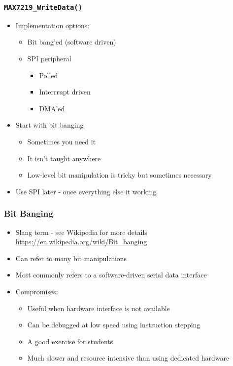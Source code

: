 \documentclass[14pt]{beamer}
\begin{document}
\begin{frame}[fragile]
\frametitle{\texttt{MAX7219\_WriteData()}}
\begin{itemize}
\item Implementation options:
	\begin{itemize}
		\item Bit bang'ed (software driven)
		\item SPI peripheral
			\begin{itemize}
				\item Polled
				\item Interrrupt driven
				\item DMA'ed
			\end{itemize}
	\end{itemize}
\pause
\item Start with bit banging
	\begin{itemize}
		\item Sometimes you need it
		\item It isn't taught anywhere
		\item Low-level bit manipulation is tricky but sometimes necessary
	\end{itemize}
\item Use SPI later - once everything else it working
\end{itemize}
\end{frame}

\begin{frame}[fragile]
\frametitle{Bit Banging}
\begin{itemize}
\item Slang term - see Wikipedia for more details\\
\small
\url{https://en.wikipedia.org/wiki/Bit_banging}
\normalsize
\item Can refer to many bit manipulations
\item Most commonly refers to a software-driven serial data interface
\item Compromises:
	\begin{itemize}
		\item Useful when hardware interface is not available
		\item Can be debugged at low speed using instruction stepping
		\item A good exercise for students
		\item Much slower and resource intensive than using dedicated hardware
	\end{itemize}
\end{itemize}
\end{frame}
\end{document}
